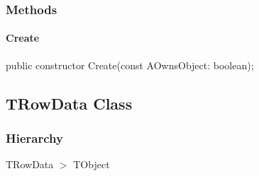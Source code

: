 \documentclass{report}
\newif\ifpdf
\begin{document}
\subsubsection*{\large{\textbf{Methods}}\normalsize\hspace{1ex}\hfill}
\paragraph*{Create}\hspace*{\fill}

\label{PasDoc_Gen.TListData-Create}
\begin{list}{}{
\setlength{\itemindent}{0cm}
\setlength{\listparindent}{0cm}
\setlength{\leftmargin}{\evensidemargin}
\addtolength{\leftmargin}{\tmplength}
\settowidth{\labelsep}{X}
\addtolength{\leftmargin}{\labelsep}
\setlength{\labelwidth}{\tmplength}
}
\item[\textbf{Declaration}\hfill]
\ifpdf
\begin{flushleft}
\fi
\begin{ttfamily}
public constructor Create(const AOwnsObject: boolean);\end{ttfamily}

\ifpdf
\end{flushleft}
\fi

\end{list}
\ifpdf
\subsection*{\large{\textbf{TRowData Class}}\normalsize\hspace{1ex}\hrulefill}
\else
\subsection*{TRowData Class}
\fi
\label{PasDoc_Gen.TRowData}
\subsubsection*{\large{\textbf{Hierarchy}}\normalsize\hspace{1ex}\hfill}
TRowData {$>$} TObject
\end{document}
